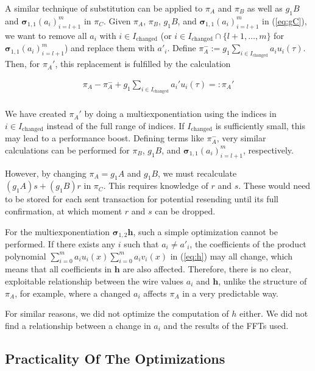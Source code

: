 \documentclass{article}
\begin{document}
A similar technique of substitution can be applied to $\pi_A$ and $\pi_B$ as well as $g_1B$ and $\boldsymbol\sigma_{1,1}(a_i)_{i=l+1}^m$ in $\pi_C$.
Given $\pi_A$, $\pi_B$, $g_1B$, and $\boldsymbol\sigma_{1,1}(a_i)_{i=l+1}^m$ in (\ref{eq:gC}), we want to remove all $a_i$ with $i \in I_\text{changed}$ (or $i \in I_\text{changed} \cap \{l+1,\ldots,m\}$ for $\boldsymbol\sigma_{1,1}(a_i)_{i=l+1}^m$) and replace them with $a'_i$.
Define $\pi^-_A := g_1{\sum_{i \in I_\text{changed}}a_iu_i(\tau)}$.
Then, for $\pi_A'$, this replacement is fulfilled by the calculation

\begin{align*}
        \pi_A - \pi^-_A + g_1{\sum_{i \in I_\text{changed}}a_i'u_i(\tau)} =: \pi_A' \\
\end{align*}

We have created $\pi_A'$ by doing a multiexponentiation using the indices in $i \in I_\text{changed}$ instead of the full range of indices.
If $I_\text{changed}$ is sufficiently small, this may lead to a performance boost.
Defining terms like $\pi^-_A$, very similar calculations can be performed for $\pi_B$, $g_1B$, and $\boldsymbol\sigma_{1,1}(a_i)_{i=l+1}^m$, respectively.

However, by changing $\pi_A = g_1A$ and $g_1B$, we must recalculate ${(g_1A)}s + {(g_1B)}r$ in $\pi_C$.
This requires knowledge of $r$ and $s$.
These would need to be stored for each sent transaction for potential resending until its full confirmation, at which moment $r$ and $s$ can be dropped.

For the multiexponentiation $\boldsymbol\sigma_{1,2}\boldsymbol{h}$, such a simple optimization cannot be performed.
If there exists any $i$ such that $a_i \neq a'_i$, the coefficients of the product polynomial $\sum_{i=0}^ma_iu_i(x)\sum_{i=0}^ma_iv_i(x)$ in (\ref{eq:h}) may all change, which means that all coefficients in $\boldsymbol{h}$ are also affected.
Therefore, there is no clear, exploitable relationship between the wire values $a_i$ and $\boldsymbol{h}$, unlike the structure of $\pi_A$, for example, where a changed $a_i$ affects $\pi_A$ in a very predictable way.

For similar reasons, we did not optimize the computation of $h$ either.
We did not find a relationship between a change in $a_i$ and the results of the FFTs used.

\subsection{Practicality Of The Optimizations} \label{sec:benchmarks}
\end{document}
